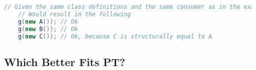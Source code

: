\begin{lstlisting}[label={lst:structural-typing-example2}, language=Java]
    // Given the same class definitions and the same consumer as in the example above.
    // Would result in the following
    g(new A()); // Ok
    g(new B()); // Ok
    g(new C()); // Ok, because C is structurally equal to A
\end{lstlisting}

\subsection{Which Better Fits PT?}\label{subsec:which-better-fits-pt?}


